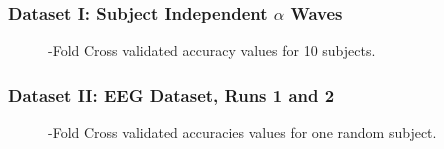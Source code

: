 \documentclass[aspectratio=169]{beamer}
\begin{document}
    \begin{frame}
        \frametitle{Dataset I: Subject Independent $\alpha $ Waves }        
   \begin{figure}[thpb]
      \centering
      \setlength\fboxsep{0pt}
	  \setlength\fboxrule{0.5pt}
      \caption{-Fold Cross validated accuracy values for 10 subjects.}
      \label{figure2}
   \end{figure}   
    \end{frame}
    
    
    \begin{frame}
      \frametitle{Dataset II: EEG Dataset, Runs 1 and 2 }
   \begin{figure}[thpb]
      \centering
      \setlength\fboxsep{0pt}
	  \setlength\fboxrule{0.5pt}
      \caption{-Fold Cross validated accuracies values for one random subject.}
      \label{figure2}
   \end{figure}          
    \end{frame}    
\end{document}
